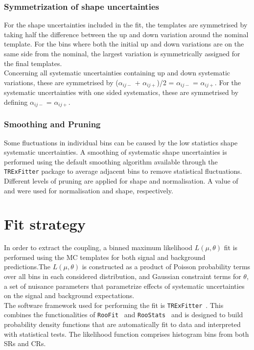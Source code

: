 \subsubsection{Symmetrization of shape uncertainties} 
For the shape uncertainties included in the fit, the templates are symmetrised by
taking half the difference between the up and down variation around
the nominal template. For the bins where both the initial up and down
variations are on the same side from the nominal, the largest
variation is symmetrically assigned for the final templates.\\
Concerning all systematic uncertainties containing up and down
systematic variations, these are symmetrised by 
($\alpha_{ij-}$ + $\alpha_{ij+}$)/2 = $\alpha_{ij-}$ = $\alpha_{ij+}$. 
For the systematic uncertainties with one sided systematics, these
are symmetrised by defining $\alpha_{ij-}$ = $\alpha_{ij+}$.

\subsubsection{Smoothing and Pruning} 
Some fluctuations in individual bins can be caused
by the low statistics shape systematic uncertainties. A smoothing of
systematic shape uncertainties is performed using the default
smoothing algorithm available through the \texttt{TRExFitter} package
to average adjacent bins to remove statistical fluctuations. \\
Different levels of pruning are applied for shape
and normalisation. A value of \prunenorm and \pruneshape were used for
normalisation and shape, respectively. 


\section {Fit strategy}
\label{sec:stat:strategy}

In order to extract the \tZc coupling, a binned maximum
likelihood $L(\mu,\theta)$ fit is performed using the MC templates for both signal and
background predictions.The $L(\mu,\theta)$ is constructed as a product of Poisson
probability terms over all bins in each considered distribution, and Gaussian constraint terms
for $\theta$, a set of nuisance parameters that parametrize effects of systematic uncertainties on the signal and background expectations.\\
The software framework used for performing the fit is \texttt{TRExFitter}~\cite{TRexfitter}.
This combines the functionalities of
\texttt{RooFit}~\cite{Verkerke:2003ir} and
\texttt{RooStats}~\cite{Moneta:2010pm} and is designed to build
probability density functions that are automatically fit to data and
interpreted with statistical tests.
The likelihood function comprises histogram bins from both SRs and
CRs.

